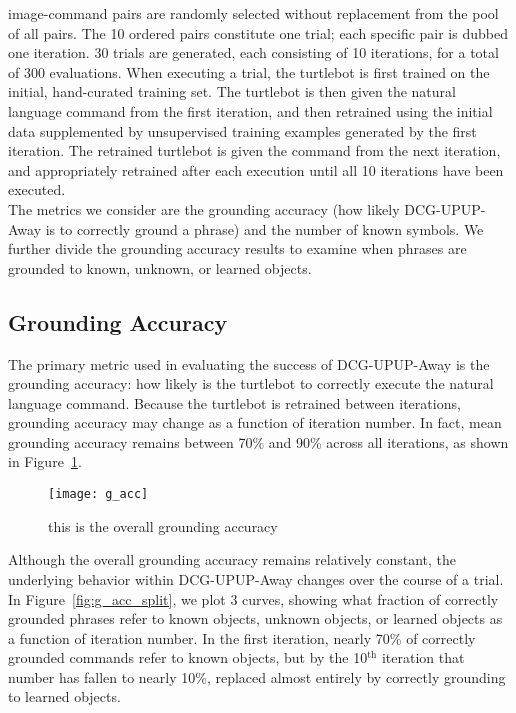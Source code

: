  image-command pairs are randomly selected without replacement from the pool of all pairs.
The 10 ordered pairs constitute one trial; each specific pair is dubbed one iteration.
30 trials are generated, each consisting of 10 iterations, for a total of 300 evaluations.
When executing a trial, the turtlebot is first trained on the initial, hand-curated training set.
The turtlebot is then given the natural language command from the first iteration, and then retrained using the initial data supplemented by unsupervised training examples generated by the first iteration.
The retrained turtlebot is given the command from the next iteration, and appropriately retrained after each execution until all 10 iterations have been executed.\\
\indent The metrics we consider are the grounding accuracy (how likely DCG-UPUP-Away is to correctly ground a phrase) and the number of known symbols.
We further divide the grounding accuracy results to examine when phrases are grounded to known, unknown, or learned objects.
\subsection{Grounding Accuracy}
The primary metric used in evaluating the success of DCG-UPUP-Away is the grounding accuracy: how likely is the turtlebot to correctly execute the natural language command.
Because the turtlebot is retrained between iterations, grounding accuracy may change as a function of iteration number.
In fact, mean grounding accuracy remains between 70\% and 90\% across all iterations, as shown in Figure~\ref{fig:g_acc}.\\
\begin{figure}[h]
\centering
\texttt{[image: g\_acc]}
\caption{this is the overall grounding accuracy}
\label{fig:g_acc}
\end{figure}

\indent Although the overall grounding accuracy remains relatively constant, the underlying behavior within DCG-UPUP-Away changes over the course of a trial.
In Figure~\ref{fig:g_acc_split}, we plot 3 curves, showing what fraction of correctly grounded phrases refer to known objects, unknown objects, or learned objects as a function of iteration number.
In the first iteration, nearly 70\% of correctly grounded commands refer to known objects, but by the 10$^\text{th}$ iteration that number has fallen to nearly 10\%, replaced almost entirely by correctly grounding to learned objects.

